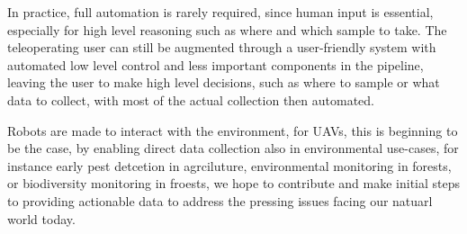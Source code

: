 In practice, full automation is rarely required, since human input is essential, especially for high level reasoning such as where and which sample to take.
The teleoperating user can still be augmented through a user-friendly system with automated low level control and less important components in the pipeline, leaving the user to make high level decisions, such as where to sample or what data to collect, with most of the actual collection then automated.

Robots are made to interact with the environment, for UAVs, this is beginning to be the case, by enabling direct data collection also in environmental use-cases, for instance early pest detcetion in agrciluture, environmental monitoring in forests, or biodiversity monitoring in froests, we hope to contribute and make initial steps to providing actionable data to address the pressing issues facing our natuarl world today.
